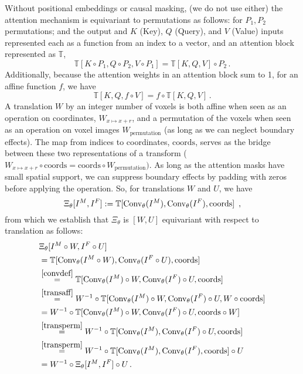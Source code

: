 Without positional embeddings or causal masking, (we do not use
either) the attention mechanism is equivariant to permutations as follows: for $P_1, P_2$ permutations; and the output and $K$ (Key), $Q$ (Query), and $V$ (Value) inputs represented each as a function from an index to a vector, and an attention block represented as $\mathbb{T}$,
\begin{equation} \mathbb{T}[K \circ P_1, Q \circ P_2, V \circ P_1] = \mathbb{T}[K, Q, V] \circ P_2\,. \label{transperm}\end{equation}
Additionally, because the attention weights in an attention block sum to 1, for an affine function $f$, we have 
\begin{equation}\mathbb{T}[K, Q, f\circ V] = f \circ \mathbb{T}[K, Q, V]\,. \label{transaff}\end{equation}
A translation $W$ by an integer number of voxels is both affine when seen as an operation on coordinates, $W_{x \mapsto x + r}$, and a permutation of the
voxels when seen as an operation on voxel images $W_{\text{permutation}}$ (as long as we can neglect boundary effects). The map from indices to coordinates, $\text{coords}$, serves as the bridge between these two representations of a transform ($W_{x \mapsto x + r} \circ \text{coords} = \text{coords} \circ W_{\text{permutation}})$. As long as the attention masks have small spatial support, we can suppress boundary effects by padding with zeros before applying the operation. So, for translations $W$ and $U$, we have
\[\Xi_\theta[ I^M, I^F] :=\mathbb{T}[\operatorname{Conv}_\theta (I^M ) , \operatorname{Conv}_\theta(I^F), \text{coords}]\enspace, \]
from which we establish that $\Xi_\theta$ is $[W, U]$ equivariant with respect to translation as follows: 
\begin{equation}
	\begin{split}
		& \Xi_\theta[ I^M \circ W, I^F \circ U]  \\
        & =\mathbb{T}[\operatorname{Conv}_\theta (I^M \circ W) , \operatorname{Conv}_\theta(I^F \circ U), \text{coords}]          \\
		& \stackrel{\eqref{convdef}}{=} \mathbb{T}[\operatorname{Conv}_\theta (I^M) \circ W , \operatorname{Conv}_\theta(I^F) \circ U, \text{coords}] \\
		& \stackrel{\eqref{transaff}}{=} W^{-1} \circ \mathbb{T}[\operatorname{Conv}_\theta (I^M) \circ W, \operatorname{Conv}_\theta(I^F) \circ U, W \circ \text{coords}] \\
		& = W^{-1} \circ \mathbb{T}[\operatorname{Conv}_\theta (I^M) \circ W, \operatorname{Conv}_\theta(I^F) \circ U, \text{coords} \circ W]  \\
		& \stackrel{\eqref{transperm}}{=} W^{-1} \circ \mathbb{T}[\operatorname{Conv}_\theta (I^M), \operatorname{Conv}_\theta(I^F) \circ U, \text{coords}] \\
		& \stackrel{\eqref{transperm}}{=}  W^{-1} \circ \mathbb{T}[\operatorname{Conv}_\theta (I^M), \operatorname{Conv}_\theta(I^F), \text{coords}] \circ U \\
		& =  W^{-1} \circ \Xi_\theta[ I^M , I^F] \circ U\,.
	\end{split}
\end{equation}
